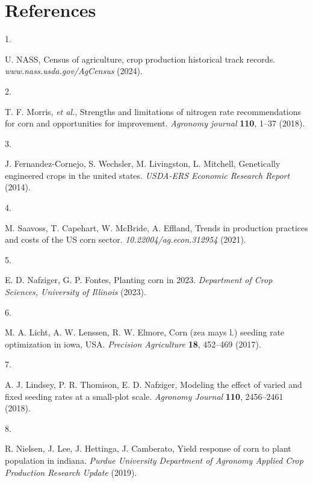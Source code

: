 \documentclass[
]{article}
\newlength{\cslhangindent}
\newlength{\csllabelwidth}
\newenvironment{CSLReferences}[2] %
 {\begin{list}{}{%
  \setlength{\itemindent}{0pt}
  \setlength{\leftmargin}{0pt}
  \setlength{\parsep}{0pt}
  \ifodd #1
   \setlength{\leftmargin}{\cslhangindent}
   \setlength{\itemindent}{-1\cslhangindent}
  \fi
  \setlength{\itemsep}{#2\baselineskip}}}
 {\end{list}}
\newcommand{\CSLLeftMargin}[1]{\parbox[t]{\csllabelwidth}{\strut#1\strut}}
\newcommand{\CSLRightInline}[1]{\parbox[t]{\linewidth - \csllabelwidth}{\strut#1\strut}}
\begin{document}
\section*{References}\label{references}

\label{refs}
\begin{CSLReferences}{0}{1}
\CSLLeftMargin{1. }%
\CSLRightInline{U. NASS, Census of agriculture, crop production
historical track records. \emph{www.nass.usda.gov/AgCensus} (2024).}

\CSLLeftMargin{2. }%
\CSLRightInline{T. F. Morris, \emph{et al.}, Strengths and limitations
of nitrogen rate recommendations for corn and opportunities for
improvement. \emph{Agronomy journal} \textbf{110}, 1--37 (2018).}

\CSLLeftMargin{3. }%
\CSLRightInline{J. Fernandez-Cornejo, S. Wechsler, M. Livingston, L.
Mitchell, Genetically engineered crops in the united states.
\emph{USDA-ERS Economic Research Report} (2014).}

\CSLLeftMargin{4. }%
\CSLRightInline{M. Saavoss, T. Capehart, W. McBride, A. Effland, Trends
in production practices and costs of the US corn sector.
\emph{10.22004/ag.econ.312954} (2021).}

\CSLLeftMargin{5. }%
\CSLRightInline{E. D. Nafziger, G. P. Fontes, Planting corn in 2023.
\emph{Department of Crop Sciences, University of Illinois} (2023).}

\CSLLeftMargin{6. }%
\CSLRightInline{M. A. Licht, A. W. Lenssen, R. W. Elmore, Corn (zea mays
l.) seeding rate optimization in iowa, USA. \emph{Precision Agriculture}
\textbf{18}, 452--469 (2017).}

\CSLLeftMargin{7. }%
\CSLRightInline{A. J. Lindsey, P. R. Thomison, E. D. Nafziger, Modeling
the effect of varied and fixed seeding rates at a small-plot scale.
\emph{Agronomy Journal} \textbf{110}, 2456--2461 (2018).}

\CSLLeftMargin{8. }%
\CSLRightInline{R. Nielsen, J. Lee, J. Hettinga, J. Camberato, Yield
response of corn to plant population in indiana. \emph{Purdue University
Department of Agronomy Applied Crop Production Research Update} (2019).}


\end{CSLReferences}
\end{document}
